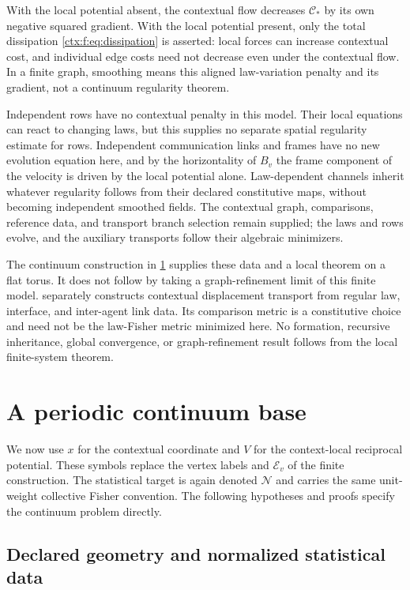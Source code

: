 With the local potential absent, the contextual flow decreases $\mathcal C_*$ by its own negative squared gradient. With the local potential present, only the total dissipation \cref{ctx:f:eq:dissipation} is asserted: local forces can increase contextual cost, and individual edge costs need not decrease even under the contextual flow. In a finite graph, smoothing means this aligned law-variation penalty and its gradient, not a continuum regularity theorem.

Independent rows have no contextual penalty in this model. Their local equations can react to changing laws, but this supplies no separate spatial regularity estimate for rows. Independent communication links and frames have no new evolution equation here, and by the horizontality of $B_v$ the frame component of the velocity is driven by the local potential alone. Law-dependent channels inherit whatever regularity follows from their declared constitutive maps, without becoming independent smoothed fields. The contextual graph, comparisons, reference data, and transport branch selection remain supplied; the laws and rows evolve, and the auxiliary transports follow their algebraic minimizers.

The continuum construction in \cref{ctx:continuum} supplies these data and a local theorem on a flat torus. It does not follow by taking a graph-refinement limit of this finite model.  separately constructs contextual displacement transport from regular law, interface, and inter-agent link data. Its comparison metric is a constitutive choice and need not be the law-Fisher metric minimized here. No formation, recursive inheritance, global convergence, or graph-refinement result follows from the local finite-system theorem.


\section{A periodic continuum base}
\label{ctx:continuum}

We now use $x$ for the contextual coordinate and $V$ for the context-local reciprocal potential. These symbols replace the vertex labels and $\mathcal E_v$ of the finite construction. The statistical target is again denoted $\mathcal N$ and carries the same unit-weight collective Fisher convention. The following hypotheses and proofs specify the continuum problem directly.

\subsection{Declared geometry and normalized statistical data}

